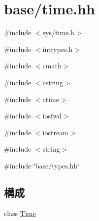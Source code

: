 \hypertarget{time_8hh}{
\section{base/time.hh}
\label{time_8hh}
}
{\ttfamily \#include $<$sys/time.h$>$}\par
{\ttfamily \#include $<$inttypes.h$>$}\par
{\ttfamily \#include $<$cmath$>$}\par
{\ttfamily \#include $<$cstring$>$}\par
{\ttfamily \#include $<$ctime$>$}\par
{\ttfamily \#include $<$iosfwd$>$}\par
{\ttfamily \#include $<$iostream$>$}\par
{\ttfamily \#include $<$string$>$}\par
{\ttfamily \#include \char`\"{}base/types.hh\char`\"{}}\par
\subsection*{構成}
\begin{DoxyCompactItemize}
\item 
class \hyperlink{classTime}{Time}
\end{DoxyCompactItemize}

